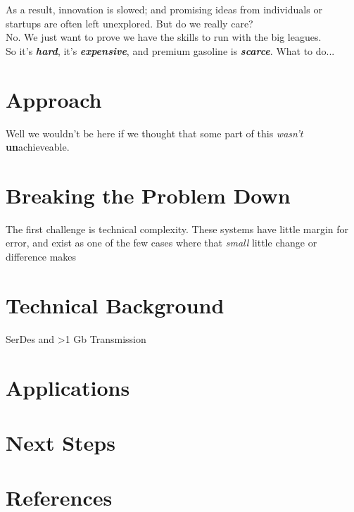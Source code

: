\documentclass[12pt]{article}
\begin{document}
As a result, innovation is slowed; and promising ideas from individuals or startups are often left unexplored.
But do we really care? \\ No. We just want to prove we have the skills to run with the big leagues.
\\
So it's \textbf{\emph{hard}}, it's \textbf{\emph{expensive}}, and premium gasoline is \textbf{\emph{scarce}}. What to do...
\clearpage


\section*{Approach}

Well we wouldn't be here if we thought that some part of this \emph{wasn't} \textbf{un}achieveable.

\section{Breaking the Problem Down}
The first challenge is technical complexity. These systems have little margin for error, and exist as one of the few cases where that \emph{small} little change or difference makes 

\clearpage


\section*{Technical Background}

SerDes and >1 Gb Transmission


\clearpage


\section*{Applications}

\clearpage


\section*{Next Steps}

\clearpage


\section*{References}

\clearpage
\end{document}
